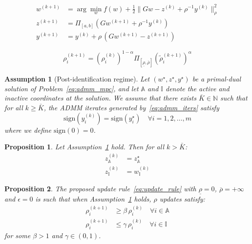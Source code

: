 \documentclass[10pt,a4paper]{amsart}
\newtheorem{assumption}{Assumption}
\newtheorem{proposition}{Proposition}
\begin{document}
\begin{equation}
\label{eq:admm_iters}
\begin{aligned}
w^{(k+1)} &= \arg \min_w f(w) + \frac{1}{2} \| Gw - z^{(k)} + \rho^{-1} y^{(k)}\|_{\rho}^2 \\
z^{(k+1)} &= \Pi_{[a,b]} \left(Gw^{(k+1)} + \rho^{-1} y^{(k)} \right) \\
y^{(k+1)} &= y^{(k)} + \rho\, (G w^{(k+1)} - z^{(k+1)})
\end{aligned}
\end{equation}

\begin{equation}
\label{eq:update_rule}
    \rho_i^{(k+1)} =\left( \rho^{(k)}_i \right)^{1-\alpha} \Pi_{[\underline{\rho}, \overline{\rho}]} \left(\tilde{\rho}_i^{(k+1)}\right)^{\alpha} 
\end{equation}

\begin{assumption}[Post-identification regime]
\label{assumption:1}
Let $(w^{\star}, z^{\star}, y^{\star})$ be a primal-dual solution of Problem~\eqref{eq:admm_mpc}, and let $\mathbb{A}$ and $\mathbb{I}$ denote the active and inactive coordinates at the solution. We assume that there exists $\bar{K} \in \mathbb{N}$ such that for all $k \geq \bar{K}$, the ADMM iterates generated by~\eqref{eq:admm_iters} satisfy
\begin{equation}
\label{eq:assumtion_1}
\text{sign}(y_i^{(k)}) = \text{sign}(y_i^{\star}) \quad \forall i =1,2,\dots, m
\end{equation}
where we define $\text{sign}(0) = 0$.
\end{assumption}

\begin{proposition}
\label{prop:assumption_1}
Let Assumption~\ref{assumption:1} hold. Then for all $k > \bar{K}$:
\begin{equation}
\begin{aligned}
    z_{\mathbb{A}}^{(k)} &= z_{\mathbb{A}}^{\star} \\
    z_{\mathbb{I}}^{(k)} &= w_{\mathbb{I}}^{(k)}
\end{aligned}
\end{equation}
\end{proposition}

\begin{proposition}
\label{prop:rho_dynamics}
    The proposed update rule~\eqref{eq:update_rule} with $\underline{\rho} = 0$, $\overline{\rho} = +\infty$ and $\epsilon=0$ is such that when Assumption~\ref{assumption:1} holds, $\rho$ updates satisfy:
    \begin{equation}
    \label{eq:assumption_2}
    \begin{aligned}
        \rho_i^{(k+1)} &\ge \beta\, \rho_i^{(k)} \quad \forall i \in \mathbb{A} \\
        \rho_i^{(k+1)} &\le \gamma\, \rho_i^{(k)} \quad \forall i \in \mathbb{I}
    \end{aligned}
    \end{equation}
for some $\beta > 1$ and $\gamma \in (0, 1)$.
\end{proposition}
\end{document}
